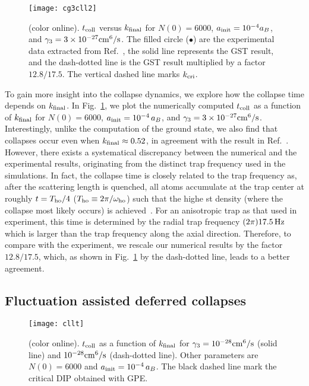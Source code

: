 \documentclass[pra,twocolumn,preprintnumbers,superscriptaddress,longbibliography,showkeys]{revtex4-1}
\begin{document}
\begin{figure}[ptb]
\texttt{[image: cg3cll2]}
\caption{(color online). $t_{\rm coll}$ versus $k_{\rm final}$ for $N(0)=6000$, $a_{\rm init}=10^{-4} a_B$, and $\gamma_{3} = 3 \times 10^{-27} {\rm cm}^{6} / {\rm s}$. The filled circle ($\bullet$) are the experimental data extracted from Ref.~\cite{CllRb2}, the solid line represents the GST result, and the dash-dotted line is the GST result multiplied by a factor $12.8/17.5$. The vertical dashed line marks $k_{\rm cri}$.}\label{tcoll1}
\end{figure}

To gain more insight into the collapse dynamics, we explore how the collapse time depends on $k_{\rm final}$. In Fig.~\ref{tcoll1}, we plot the numerically computed $t_{\rm coll}$ as a function of $k_{\rm final}$ for $N(0)=6000$, $a_{\rm init}=10^{-4}\,a_B$, and $\gamma_{3} = 3 \times 10^{-27} {\rm cm}^{6} / {\rm s}$. Interestingly, unlike the computation of the ground state, we also find that collapses occur even when $k_{\rm final}\approx 0.52$, in agreement with the result in Ref.~\cite{collapsingDynamic}. However, there exists a systematical discrepancy between the numerical and the experimental results, originating from the distinct trap frequency used in the simulations. In fact, the collapse time is closely related to the trap frequency as, after the scattering length is quenched, all atoms accumulate at the trap center at roughly $t=T_{\rm ho}/4$ ($T_{\rm ho}\equiv 2\pi/\omega_{\rm ho}$) such that the highe    st density (where the collapse most likely occurs) is achieved~\cite{frequency}. For an anisotropic trap as that used in experiment, this time is determined by the radial trap frequency $(2\pi)17.5\,{\rm Hz}$~\cite{CllRb1,CllRb2} which is larger than the trap frequency along the axial direction. Therefore, to compare with the experiment, we rescale our numerical results by the factor $12.8/17.5$, which, as shown in Fig.~\ref{tcoll1} by the dash-dotted line, leads to a better agreement.

\subsection{Fluctuation assisted deferred collapses}

\begin{figure}[ptb]
\texttt{[image: cllt]}
	\caption{(color online). $t_{\rm coll}$ as a function of $k_{\rm final}$ for $\gamma_{3} = 10^{-28} {\rm cm}^{6} / {\rm s}$ (solid line) and $10^{-28} {\rm cm}^{6} / {\rm s}$ (dash-dotted line). Other parameters are $N(0)=6000$ and $a_{\rm init}=10^{-4}\,a_B$. The black dashed line mark the critical DIP obtained with GPE.}
\label{cllt}
\end{figure}
\end{document}
